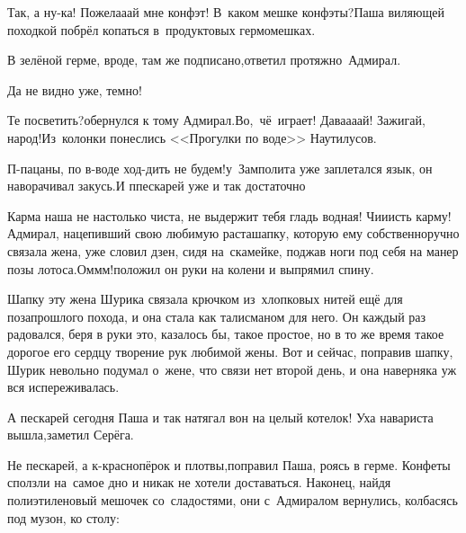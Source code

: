 
\diagdash Так, а ну-ка! Пожела\sdash а\sdash ай мне конфэт! В~каком мешке конфэты?\mdash Паша виляющей походкой побрёл копаться в~продуктовых гермомешках.

\diagdash В зелёной герме, вроде, там же подписано,\mdash ответил протяжно~Адмирал.

\diagdash Да не видно уже, темно!

\diagdash Те посветить?\mdash обернулся к тому Адмирал.\mdash Во,~чё~играет! Дава\sdash а\sdash а\sdash ай! Зажигай, народ!\mdash Из~колонки понеслись <<Прогулки по воде>> Наутилусов.

%
%

\diagdash П-пацаны, по в-воде ход-дить не будем!\mdash у~Замполита уже заплетался язык, он наворачивал закусь.\mdash И п\sdash пескарей уже и так достаточно\myldots{}

\diagdash Карма наша не настолько чиста, не выдержит тебя гладь водная! Чи\sdash и\sdash исть карму!\mdash Адмирал, нацепивший свою любимую раста\sdash шапку, которую ему собственноручно связала жена, уже словил дзен, сидя на~скамейке, поджав ноги под себя на манер позы лотоса.\mdash Ом\sdash м\sdash м!\mdash положил он руки на колени и выпрямил спину.

Шапку эту жена Шурика связала крючком из~хлопковых нитей ещё для позапрошлого похода, и она стала как талисманом для него. Он каждый раз радовался, беря в руки это, казалось бы, такое простое, но в то же время такое дорогое его сердцу творение рук любимой жены. Вот и сейчас, поправив шапку, Шурик невольно подумал о~жене, что связи нет второй день, и она наверняка уж вся испереживалась. 

\diagdash А пескарей сегодня Паша и так натягал вон на целый котелок! Уха навариста вышла,\mdash заметил Серёга.

\diagdash Не пескарей, а к-краснопёрок и плотвы,\mdash поправил Паша, роясь в герме. Конфеты сползли на~самое дно и никак не хотели доставаться. Наконец, найдя полиэтиленовый мешочек со~сладостями, они с~Адмиралом вернулись, колбасясь под музон, ко столу:

